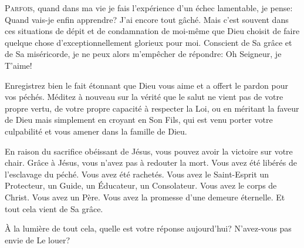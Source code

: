 



\lettrine{P}{arfois}, quand dans ma vie je fais l'expérience
 d'un échec lamentable, je pense: 
 \Og Quand vais-je enfin apprendre? J'ai encore tout gâché. \Fg{}
 Mais c'est souvent dans ces situations de dépit et de condamnation
 de moi-même que Dieu choisit de faire quelque chose d'exceptionnellement
 glorieux pour moi. Conscient de Sa grâce et de Sa miséricorde,
 je ne peux alors m'empêcher de répondre: 
 \Og Oh Seigneur, je T'aime! \Fg{}


Enregistrez bien le fait étonnant que Dieu vous aime et a offert
 le pardon pour vos péchés. Méditez à nouveau sur la vérité
 que le salut ne vient pas de votre propre vertu,
 de votre propre capacité à respecter la Loi,
 ou en méritant la faveur de Dieu mais simplement en croyant en Son Fils,
 qui est venu porter votre culpabilité et vous amener dans la famille de Dieu.

En raison du sacrifice obéissant de Jésus, vous pouvez avoir la victoire
 sur votre chair. Grâce à Jésus, vous n'avez pas à redouter la mort.
 Vous avez été libérés de l'esclavage du péché. Vous avez été rachetés.
 Vous avez le Saint-Esprit \ocadr un Protecteur, un Guide, un Éducateur,
 un Consolateur. Vous avez le corps de Christ. Vous avez un Père.
 Vous avez la promesse d'une demeure éternelle.
 Et tout cela vient de Sa grâce.

À la lumière de tout cela, quelle est votre réponse aujourd'hui?
 N'avez-vous pas envie de Le louer?

\dvrule



